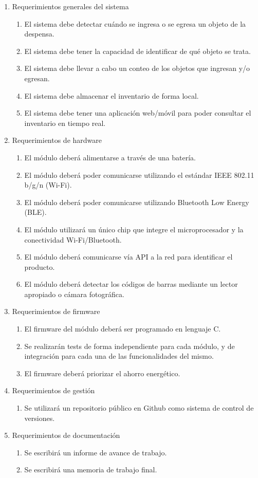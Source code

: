 \documentclass[
11pt, %
codirector, %
]{charter}
\begin{document}
\begin{enumerate}
	\item Requerimientos generales del sistema
		\begin{enumerate}
			\item El sistema debe detectar cuándo se ingresa o se egresa un objeto de la despensa.
			\item El sistema debe tener la capacidad de identificar de qué objeto se trata.
			\item El sistema debe llevar a cabo un conteo de los objetos que ingresan y/o egresan.
    \item El sistema debe almacenar el inventario de forma local.
    \item El sistema debe tener una aplicación web/móvil para poder consultar el inventario en tiempo real.
           
		\end{enumerate}
	\item Requerimientos de hardware
		\begin{enumerate}
			 \item El módulo deberá alimentarse a través de una batería.
			\item El módulo deberá poder comunicarse utilizando el estándar IEEE 802.11 b/g/n
(Wi-Fi).
            \item El módulo deberá poder comunicarse utilizando Bluetooth Low Energy (BLE).
            \item El módulo utilizará un único chip que integre el microprocesador y la conectividad Wi-Fi/Bluetooth.
            \item El módulo deberá comunicarse vía API a la red para identificar el producto.
            \item El módulo deberá detectar los códigos de barras mediante un lector apropiado o cámara fotográfica.
		\end{enumerate}
	\item Requerimientos de firmware
         \begin{enumerate}
            \item El firmware del módulo deberá ser programado en lenguaje C.
            \item Se realizarán tests de forma independiente para cada módulo, y de integración para cada una de las funcionalidades del mismo.
            \item El firmware deberá priorizar el ahorro energético. 
         \end{enumerate}
	\item Requerimientos de gestión
        \begin{enumerate}
            \item Se utilizará un repositorio público en Github como sistema de control de versiones.
         \end{enumerate}
    \item Requerimientos de documentación
        \begin{enumerate}
            \item Se escribirá un informe de avance de trabajo.
            \item Se escribirá una memoria de trabajo final.


\end{enumerate}
\end{enumerate}
\end{document}
